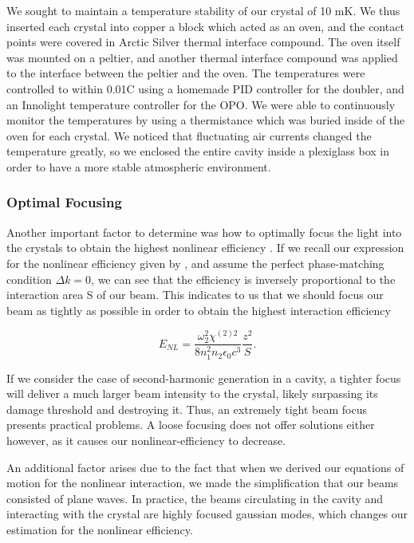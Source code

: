 We sought to maintain a temperature stability of our crystal of 10 mK.  We thus inserted each crystal into copper a block which acted as an oven, and the contact points were covered in Arctic Silver thermal interface compound.  The oven itself was mounted on a peltier, and another thermal interface compound was applied to the interface between the peltier and the oven.  The temperatures were controlled to within 0.01\textdegree C using a homemade PID controller for the doubler, and an Innolight temperature controller for the OPO.  We were able to continuously monitor the temperatures by using a thermistance which was buried inside of the oven for each crystal. We noticed that fluctuating air currents changed the temperature greatly, so we enclosed the entire cavity inside a plexiglass box in order to have a more stable atmospheric environment.

\subsubsection{Optimal Focusing}
\label{optimal_focusing} 

Another important factor to determine was how to optimally focus the light into the crystals to obtain the highest nonlinear efficiency \cite{BourzeixPhD}.  If we recall our expression for the nonlinear efficiency given by , and assume the perfect phase-matching condition $\Delta k=0$, we can see that the efficiency is inversely proportional to the interaction area S of our beam.  This indicates to us that we should focus our beam as tightly as possible in order to obtain the highest interaction efficiency

\begin{equation}
  \label{eq:enl2}
  E_{NL} = \frac{\omega^2_2 \chi^{(2)2}}{8 n_1^2 n_2 \epsilon_0 c^3} \frac{z^2}{S}  .
\end{equation}

If we consider the case of second-harmonic generation in a cavity, a tighter focus will deliver a much larger beam intensity to the crystal, likely surpassing its damage threshold and destroying it.  Thus, an extremely tight beam focus presents practical problems.  A loose focusing does not offer solutions either however, as it causes our nonlinear-efficiency to decrease.

An additional factor arises due to the fact that when we derived our equations of motion for the nonlinear interaction, we made the simplification that our beams consisted of plane waves.  In practice, the beams circulating in the cavity and interacting with the crystal are highly focused gaussian modes, which changes our estimation for the nonlinear efficiency.

